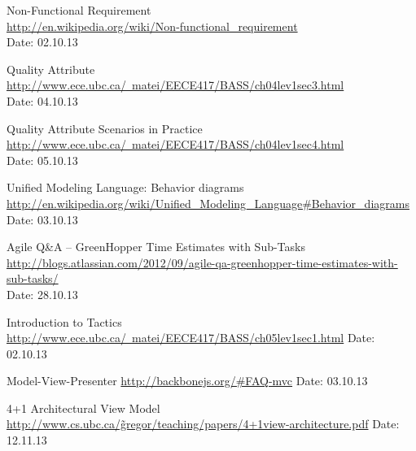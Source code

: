 \begin{thebibliography}{99}
	Non-Functional Requirement \\
	\href{http://en.wikipedia.org/wiki/Non-functional_requirement}{http://en.wikipedia.org/wiki/Non-functional\_requirement} \\
	Date: 02.10.13

	Quality Attribute \\
	\href{http://www.ece.ubc.ca/~matei/EECE417/BASS/ch04lev1sec3.html}{http://www.ece.ubc.ca/~matei/EECE417/BASS/ch04lev1sec3.html} \\
	Date: 04.10.13

	Quality Attribute Scenarios in Practice \\ 
	\href{http://www.ece.ubc.ca/~matei/EECE417/BASS/ch04lev1sec4.html}{http://www.ece.ubc.ca/~matei/EECE417/BASS/ch04lev1sec4.html} \\
	Date: 05.10.13

	Unified Modeling Language: Behavior diagrams
	\href {http://en.wikipedia.org/wiki/Unified_Modeling_Language#Behavior_diagrams }{http://en.wikipedia.org/wiki/Unified\_Modeling\_Language\#Behavior\_diagrams}
	Date: 03.10.13

	Agile Q\&A – GreenHopper Time Estimates with Sub-Tasks \\
	\href{http://blogs.atlassian.com/2012/09/agile-qa-greenhopper-time-estimates-with-sub-tasks/}{http://blogs.atlassian.com/2012/09/agile-qa-greenhopper-time-estimates-with-sub-tasks/} \\
	Date: 28.10.13


	Introduction to Tactics \newline
	\href {http://www.ece.ubc.ca/~matei/EECE417/BASS/ch05lev1sec1.html}{http://www.ece.ubc.ca/~matei/EECE417/BASS/ch05lev1sec1.html} \newline
	Date: 02.10.13

	Model-View-Presenter\newline
	\href {http://backbonejs.org/\#FAQ-mvc}{http://backbonejs.org/\#FAQ-mvc}\newline
	Date: 03.10.13

	4+1 Architectural View Model
	\href{http://www.cs.ubc.ca/~gregor/teaching/papers/4+1view-architecture.pdf}{http://www.cs.ubc.ca/\~gregor/teaching/papers/4+1view-architecture.pdf}
	Date: 12.11.13


\end{thebibliography}
